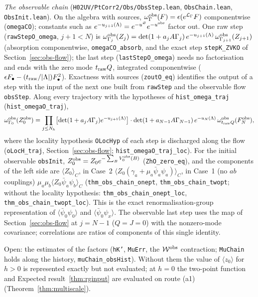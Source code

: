 \documentclass[11pt]{amsart}
\theoremstyle{definition}
\theoremstyle{remark}
\numberwithin{equation}{section}
\newcommand{\avg}[1]{\langle #1\rangle}
\begin{document}
\emph{The observable chain} (\texttt{H02UV/PtCorr2/Obs/ObsStep.lean}, \texttt{ObsChain.lean}, \texttt{ObsInit.lean}). On the algebra with
sources, $\omega^{\rm obs}_\Gamma(F)=\epsilon(e^{\mathcal L_\Gamma}F)$ componentwise (\texttt{omegaCO}); constants such as
$e^{-u_{j+1}(\Lambda)}=e^{-u^\varnothing}e^{-u^{\rm obs}}$ factor out. One raw step (\texttt{rawStepO\_omega}, $j+1<N$) is
$\omega^{\rm obs}_{\Gamma_j}(Z_j)=\det(1+a_jA\Gamma_j)\,e^{-u_{j+1}(\Lambda)}\,\omega^{\rm obs}_{\Gamma_{j+1}}(Z_{j+1})$ (absorption componentwise,
\texttt{omegaCO\_absorb}, and the exact step \texttt{stepK\_ZVKO} of Section~\ref{sec:obs-flow}); the last step
(\texttt{lastStepO\_omega}) needs no factorisation and ends with the zero mode $t_{\rm raw}Q$, integrated componentwise
($\epsilon F_\bullet-(t_{\rm raw}/|\Lambda|)F_\bullet^2$). Exactness with sources (\texttt{zoutO\_eq}) identifies the output of a step with the
input of the next one built from \texttt{rawStep} and the observable flow \texttt{obsStep}. Along every trajectory with the
hypotheses of \texttt{hist\_omega\_traj} (\texttt{hist\_omegaO\_traj}),
\[
  \omega^{\rm obs}_{\Gamma_0}(Z_0^{\rm obs})=\prod_{j\le N_h}\bigl[\det(1+a_jA\Gamma_j)e^{-u_{j+1}(\Lambda)}\bigr]\cdot\det(1+a_{N-1}A\Gamma_{N-1})\,e^{-u_N(\Lambda)}\,
  \omega^{\rm obs}_{t_{\rm raw}Q}(F_N^{\rm obs}),
\]
where the locality hypothesis \texttt{OLocHyp} of each step is discharged along the flow (\texttt{oLocH\_traj},
Section~\ref{sec:obs-flow}; \texttt{hist\_omegaO\_traj\_loc}). For the initial observable \texttt{obsInit}, $Z_0^{\rm obs}=Z_0e^{-\sum_BV^{\rm obs}_0(B)}$
(\texttt{ZhO\_zero\_eq}), and the components of the left side are $\avg{Z_0}_C$, in Case~2 $\avg{Z_0(\gamma_a+\mu_a\bar\psi_a\psi_a)}_C$,
in Case~1 (no $ab$ couplings) $\mu_a\mu_b\avg{Z_0\bar\psi_a\psi_b}_C$ (\texttt{thm\_obs\_chain\_onept},
\texttt{thm\_obs\_chain\_twopt}; without the locality hypothesis: \texttt{thm\_obs\_chain\_onept\_loc},
\texttt{thm\_obs\_chain\_twopt\_loc}). This is the exact renormalisation-group representation of $\avg{\bar\psi_0\psi_0}$ and
$\avg{\bar\psi_0\psi_x}$. The observable last step uses the map of Section~\ref{sec:obs-flow} at $j=N-1$ ($Q=J=0$) with the
nonzero-mode covariance; correlations are ratios of components of this single identity.

Open: the estimates of the factors
(\texttt{hK'}, \texttt{MuErr}, the $\mathcal W^{\rm obs}$ contraction; \texttt{MuChain} holds along the history, \texttt{muChain\_obsHist}). Without them the value of $\avg{z_0}$ for $h>0$ is represented exactly but not
evaluated; at $h=0$ the two-point function and Expected result~\ref{thm:rginput} are evaluated on route (a1)
(Theorem~\ref{thm:multiscale}).
\end{document}
